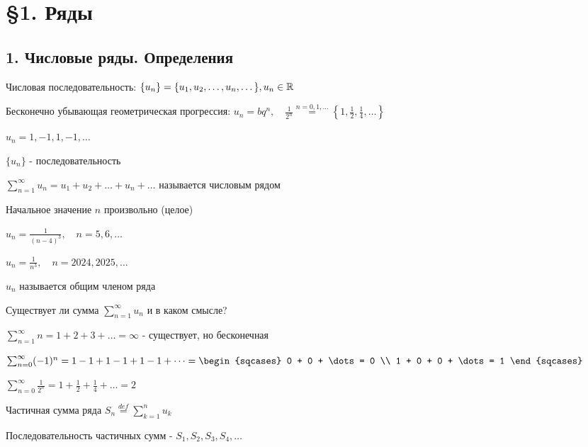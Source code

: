 \documentclass[12pt]{article}
\begin{document}
    \tableofcontents
    \clearpage


    \section{\S 1. Ряды}

    \subsection{1. Числовые ряды. Определения}

    \Mems Числовая последовательность: $\{u_n\} = \{u_1, u_2, \dots, u_n, \dots\}, u_n \in \mathbb{R}$

     Бесконечно убывающая геометрическая прогрессия: $u_n = b q^n, \quad
    \frac{1}{2^n} \stackrel{n = 0,1,\dots}{=} \left\{1, \frac{1}{2}, \frac{1}{4}, \dots\right\}$

     $u_n = 1, -1, 1, -1, \dots$

    \hypertarget{numberseriesdefinition}{}

    \Def $\{u_n\}$ - последовательность

    $\sum_{n = 1}^{\infty} u_n = u_1 + u_2 + \dots + u_n + \dots$ называется числовым рядом

    \Notas Начальное значение $n$ произвольно (целое)

    \Ex $u_n = \frac{1}{(n - 4)^3}, \quad n = 5, 6, \dots$

    $u_n = \frac{1}{n^3}, \quad n = 2024, 2025, \dots$

    \Notas $u_n$ называется общим членом ряда

    \Nota Существует ли сумма $\sum_{n = 1}^{\infty} u_n$ и в каком смысле?

     $\sum_{n = 1}^{\infty} n = 1 + 2 + 3 + \dots = \infty$ - существует, но бесконечная

     $\sum_{n = 0}^{\infty} (-1)^n = 1 - 1 + 1 - 1 + 1 - 1 + \dots =
    \begin{sqcases}
        0 + 0 + \dots = 0 \\
        1 + 0 + 0 + \dots = 1
    \end{sqcases}$

     $\sum_{n = 0}^\infty \frac{1}{2^n} = 1 + \frac{1}{2} + \frac{1}{4} + \dots = 2$

    \Def Частичная сумма ряда $S_n \stackrel{def}{=} \sum_{k = 1}^{n} u_k$

    \Notas Последовательность частичных сумм - $S_1, S_2, S_3, S_4, \dots$
\end{document}
